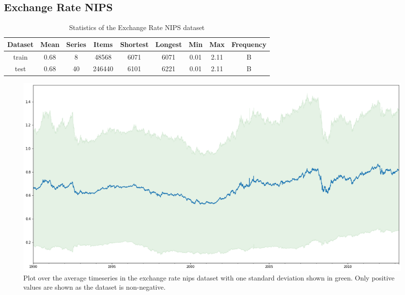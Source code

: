 \clearpage
\subsection{Exchange Rate NIPS}
\begin{table}[htb]
  \begin{tabular}{||c | c c c c c c c c ||}
    \hline
    Dataset & Mean & Series & Items  & Shortest & Longest & Min  & Max  & Frequency \\ [0.5ex]
    \hline\hline
    train   & 0.68 & 8      & 48568  & 6071     & 6071    & 0.01 & 2.11 & B         \\
    \hline
    test    & 0.68 & 40     & 246440 & 6101     & 6221    & 0.01 & 2.11 & B         \\
    \hline
  \end{tabular}
  \caption{Statistics of the Exchange Rate NIPS dataset}
\end{table}

\begin{figure}[htb]
  \centering
  \includegraphics[width=\linewidth]{./img/exchange_rate_nips_plot.png}
  \caption{Plot over the average timeseries in the exchange rate nips dataset with one standard deviation shown in green. Only positive values are shown as the dataset is non-negative.}
  \label{fig:exchange_rate_nips_plot}
  \endminipage\hfill
\end{figure}

